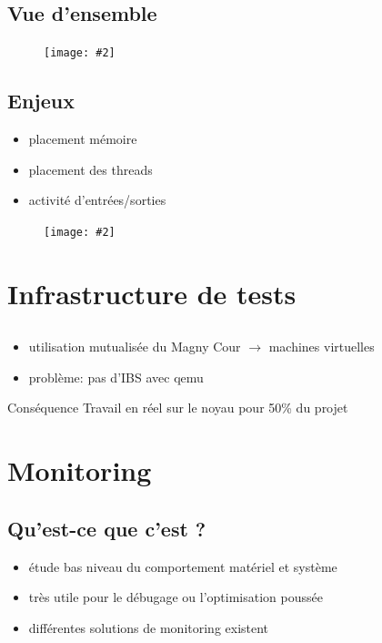 \documentclass[mathserif]{beamer}
\newcommand{\myfig}[2] {
  \begin{figure}[!h]
    \centering
    \texttt{[image: \#2]}
  \end{figure}
}
\newcommand{\bframe}{\begin{frame}{\secname}{\subsecname}}
\begin{document}
    \subsection{Vue d'ensemble}
      \bframe
        \myfig{0.4}{img/numa_arch_details.png}
      \end{frame}

    \subsection{Enjeux}
      \bframe
        \begin{itemize}
          \item placement mémoire
          \item placement des threads
          \item activité d'entrées/sorties
        \end{itemize}
        \myfig{0.4}{img/topo.png}
      \end{frame}

  \section{Infrastructure de tests}
    \subsection{}
      \bframe
        \begin{itemize}
          \item utilisation mutualisée du Magny Cour $\rightarrow$ machines
            virtuelles
          \item problème: pas d'IBS avec qemu
        \end{itemize}
      
         {
          \begin{alertblock}{Conséquence}
            Travail en réel sur le noyau pour 50\% du projet
          \end{alertblock}
        }
      \end{frame}

  \section{Monitoring}
    \subsection{Qu'est-ce que c'est ?}
      \bframe
        \begin{itemize}
          \item étude bas niveau du comportement matériel et système
          \item très utile pour le débugage ou l'optimisation poussée
          \item différentes solutions de monitoring existent
        \end{itemize}
      \end{frame}
\end{document}

